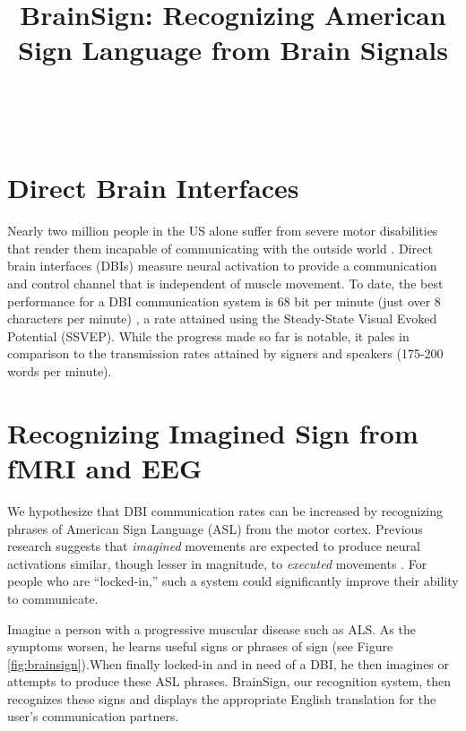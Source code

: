 \documentclass{proposal}
\title{BrainSign:  Recognizing American Sign Language
from Brain Signals}
\begin{document}
\maketitle

\\

\section{Direct Brain Interfaces}

Nearly two million people in the US alone suffer from severe motor disabilities that render them incapable of communicating with the outside world \cite{ficke1992ddp, NABMRR1992, murray1997gmd, carter1997rmn}. Direct brain interfaces (DBIs) measure neural activation to provide a communication and control channel that is independent of muscle movement. To date, the best performance for a DBI communication system is 68 bit per minute (just over 8 characters per minute) \cite{gao2003bbe}, a rate attained using the Steady-State Visual Evoked Potential (SSVEP). While the progress made so far is notable, it pales in comparison to the transmission rates attained by signers and speakers (175-200 words per minute).

\section{Recognizing Imagined Sign from fMRI and EEG}

We hypothesize that DBI communication rates can be increased by recognizing phrases of American Sign Language (ASL) from the motor cortex.  Previous research suggests that \textit{imagined} movements are expected to produce neural activations similar, though lesser in magnitude, to \textit{executed} movements \cite{beisteiner1995mrm,pfurtscheller1997mia, lang1996eam,lotze1999aac}. For people who are ``locked-in,'' such a system could significantly improve their ability to communicate.

Imagine a person with a progressive muscular disease such as ALS.  As the symptoms worsen, he learns useful signs or phrases of sign (see Figure \ref{fig:brainsign}).When finally locked-in and in need of a DBI, he then imagines or attempts to produce these ASL phrases. BrainSign, our recognition system, then recognizes these signs and displays the appropriate English translation for the user's communication partners.
\end{document}
